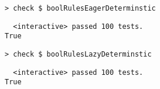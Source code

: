 \begin{frame}[fragile]
  \onslide<+->
  \begin{verbatim}
> check $ boolRulesEagerDeterminstic
  \end{verbatim}
  \onslide<+->
  \begin{verbatim}
  <interactive> passed 100 tests.
True
  \end{verbatim}
  \onslide<+->
  \begin{verbatim}
> check $ boolRulesLazyDeterminstic
  \end{verbatim}
  \onslide<+->
  \begin{verbatim}
  <interactive> passed 100 tests.
True
  \end{verbatim}
\end{frame}
